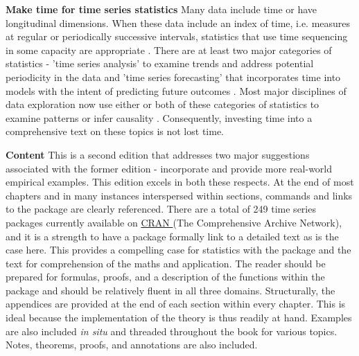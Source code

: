 \documentclass[bookreview]{jss}
\begin{document}
\textbf{Make time for time series statistics} \newline
Many data include time or have longitudinal dimensions. When these data include an index of time, i.e. measures at regular or periodically successive intervals, statistics that use time sequencing in some capacity are appropriate \citep{Senin2009}. There are at least two major categories of statistics - 'time series analysis' to examine trends and address potential periodicity in the data and 'time series forecasting' that incorporates time into models with the intent of predicting future outcomes \citep{Senin2009}. Most major disciplines of data exploration now use either or both of these categories of statistics to examine patterns or infer causality \citep{Gooijer2006}. Consequently, investing time into a comprehensive text on these topics is not lost time.  \newline


\textbf{Content} \newline
This is a second edition that addresses two major suggestions associated with the former edition - incorporate  and provide more real-world empirical examples. This edition excels in both these respects. At the end of most chapters and in many instances interspersed within sections,  commands and links to the package  are clearly referenced. There are a total of 249 time series packages currently available on \href{https://cran.r-project.org/web/views/TimeSeries.html}{CRAN }(The Comprehensive  Archive Network), and it is a strength to have a package formally link to a detailed text as is the case here. This provides a compelling case for statistics with the  package and the text for comprehension of the maths and application. The reader should be prepared for formulas, proofs, and a description of the functions within the  package  and should be relatively fluent in all three domains. Structurally, the appendices are provided at the end of each section within every chapter. This is ideal because the implementation of the theory is thus readily at hand. Examples are also included \textit{in situ} and threaded throughout the book for various topics. Notes, theorems, proofs, and annotations are also included.  \newline
\end{document}
